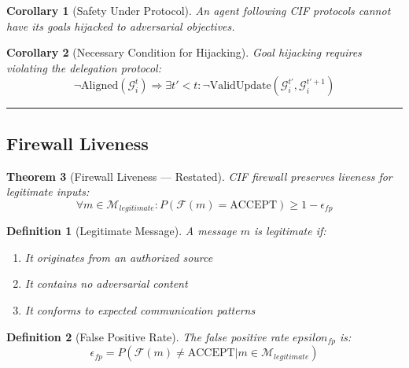 \documentclass[
]{article}
\newtheorem{definition}{Definition}[section]
\newtheorem{theorem}{Theorem}[section]
\newtheorem{corollary}[theorem]{Corollary}
\begin{document}
\begin{corollary}[Safety Under Protocol]
\label{cor:safety-protocol}
An agent following CIF protocols cannot have its goals hijacked to adversarial objectives.
\end{corollary}

\begin{corollary}[Necessary Condition for Hijacking]
\label{cor:hijack-necessary}
Goal hijacking requires violating the delegation protocol:
\begin{equation}
\label{eq:hijack-necessary}
\neg\text{Aligned}(\mathcal{G}_i^t) \Rightarrow \exists t' < t: \neg\text{ValidUpdate}(\mathcal{G}_i^{t'}, \mathcal{G}_i^{t'+1})
\end{equation}
\end{corollary}

\begin{center}\rule{0.5\linewidth}{0.5pt}\end{center}

\subsection{Firewall Liveness}\label{sec:thm59-proof}

\begin{theorem}[Firewall Liveness --- Restated]
\label{thm:firewall-liveness-restated}
CIF firewall preserves liveness for legitimate inputs:
\begin{equation}
\label{eq:firewall-liveness-restated}
\forall m \in \mathcal{M}_{legitimate}: P(\mathcal{F}(m) = \text{ACCEPT}) \geq 1 - \epsilon_{fp}
\end{equation}
\end{theorem}

\begin{definition}[Legitimate Message]
\label{def:legitimate-message}
A message $m$ is legitimate if:
\begin{enumerate}
\item It originates from an authorized source
\item It contains no adversarial content
\item It conforms to expected communication patterns
\end{enumerate}
\end{definition}

\begin{definition}[False Positive Rate]
\label{def:false-positive}
The false positive rate $epsilon_{fp}$ is:
\begin{equation}
\label{eq:false-positive}
\epsilon_{fp} = P(\mathcal{F}(m) \neq \text{ACCEPT} | m \in \mathcal{M}_{legitimate})
\end{equation}
\end{definition}
\end{document}
